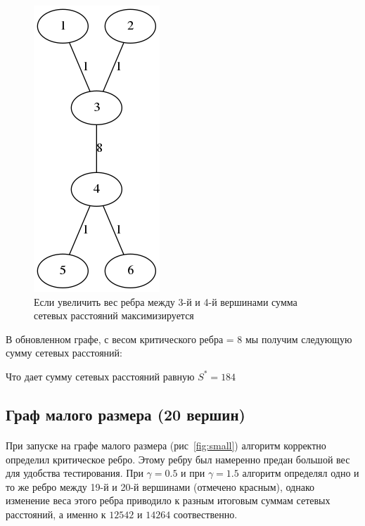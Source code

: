 \documentclass[12pt]{article}
\begin{document}
\begin{figure}[h]
    \centering
    \includegraphics[scale=0.7]{min_graph_8.png}
    \caption{Если увеличить вес ребра между 3-й и 4-й вершинами сумма сетевых расстояний максимизируется}
    \label{fig:min_graph_8}
\end{figure}

В обновленном графе, с весом критического ребра = 8 мы получим следующую
сумму сетевых расстояний:

Что дает сумму сетевых расстояний равную $S^* = 184$

\subsection{Граф малого размера (20 вершин)}

\paragraph{}
При запуске на графе малого размера (рис~\ref{fig:small}) 
алгоритм корректно определил критическое ребро.
Этому ребру был намеренно предан большой вес для удобства тестирования.
При $\gamma = 0.5$ и при $\gamma = 1.5$ алгоритм определял одно
и то же ребро между 19-й и 20-й вершинами (отмечено красным),
однако изменение веса этого ребра приводило к разным итоговым
суммам сетевых расстояний, а именно к $12542$ и $14264$ соотвественно.
\end{document}
